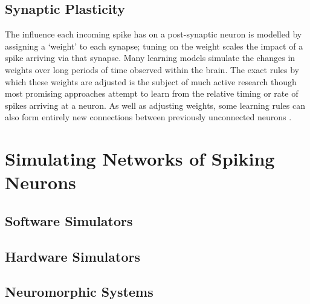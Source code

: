 \subsection{Synaptic Plasticity}
The influence each incoming spike has on a post-synaptic neuron is modelled by assigning a `weight' to each synapse;
tuning on the weight scales the impact of a spike
arriving via that synapse.
Many learning models simulate the changes in weights over long periods of time observed within the brain.
The exact rules by which these weights are adjusted is the subject of much active research though most promising approaches attempt to learn from the relative timing \cite{pfister2006triplets} or rate \cite{bienenstock1982theory} of spikes arriving at a neuron.
As well as adjusting weights, some learning rules can also form entirely new connections between previously unconnected
neurons \cite{bamford2010synaptic}.

\section{Simulating Networks of Spiking Neurons}
\label{sec:snn_sim}
\subsection{Software Simulators}
\subsection{Hardware Simulators}
\subsection{Neuromorphic Systems}
\label{sec:morph}

